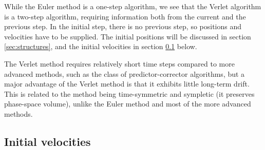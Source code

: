 \documentclass[11pt,bibliography=totoc,index=totoc]{scrbook}   %
\newcommand{\comment}[1]{\hl{#1}}
\begin{document}
While the Euler method is a one-step algorithm, we see that the Verlet algorithm is a two-step algorithm, requiring information both from the current and the previous step.
In the initial step, there is no previous step, so positions and velocities have to be supplied. 
The initial positions will be discussed in section \ref{sec:structures}, and the initial velocities in section \ref{sec:initial-velocities} below.

The Verlet method requires relatively short time steps compared to more advanced methods, such as the class
of predictor-corrector algorithms,
but a major advantage of the Verlet method is that it exhibits little long-term drift.
This is related to the method being time-symmetric and sympletic (it preserves phase-space volume), 
unlike the Euler method and most of the more advanced methods.\cite[61-63]{Frenkel:1996}



%
\subsection{Initial velocities}\label{sec:initial-velocities}
%
\end{document}
